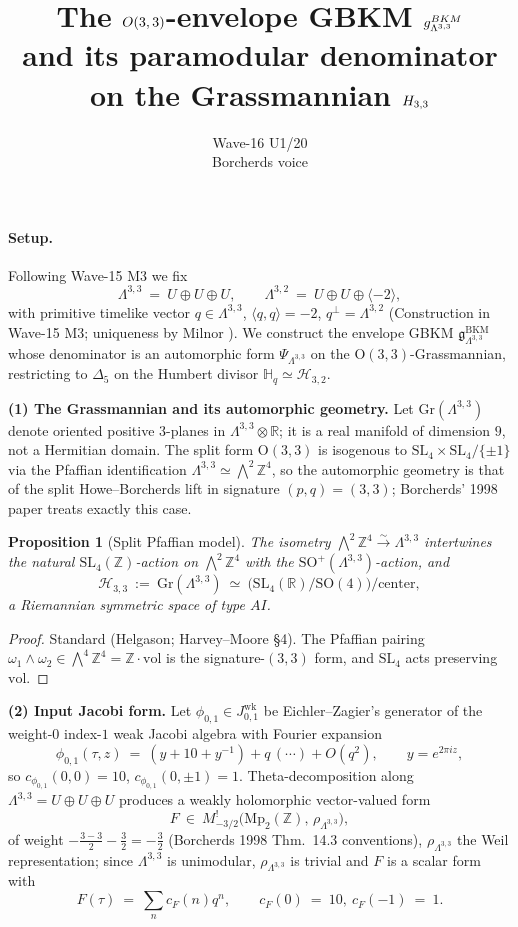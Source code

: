 \documentclass[11pt]{article}
\title{The $\OO(3,3)$-envelope GBKM
$\gBKM^{\mathrm{BKM}}_{\Lat^{3,3}}$\\
and its paramodular denominator on the Grassmannian $\cH_{3,3}$}
\author{Wave-16 U1/20 \\ Borcherds voice}
\date{}
\providecommand{\Lat}{\Lambda}
\providecommand{\Z}{\mathbb{Z}}
\providecommand{\R}{\mathbb{R}}
\providecommand{\HH}{\mathbb{H}}
\providecommand{\cH}{\mathcal{H}}
\providecommand{\gBKM}{\mathfrak{g}}
\providecommand{\OO}{\mathrm{O}}
\providecommand{\SO}{\mathrm{SO}}
\providecommand{\SL}{\mathrm{SL}}
\providecommand{\Mp}{\mathrm{Mp}}
\providecommand{\Delfive}{\Delta_{5}}
\providecommand{\Grass}{\mathrm{Gr}}
\theoremstyle{plain}
\newtheorem{proposition}[theorem]{Proposition}
\theoremstyle{definition}
\begin{document}
\maketitle

\paragraph{Setup.} Following Wave-15 M3 we fix
\[
\Lat^{3,3}\ =\ U\oplus U\oplus U,\qquad
\Lat^{3,2}\ =\ U\oplus U\oplus\langle-2\rangle,
\]
with primitive timelike vector $q\in\Lat^{3,3}$, $\langle q,q\rangle=-2$,
$q^{\perp}=\Lat^{3,2}$ (Construction in Wave-15 M3;
uniqueness by Milnor \cite[Ch.~15]{CS}). We construct the envelope
GBKM $\gBKM^{\mathrm{BKM}}_{\Lat^{3,3}}$ whose denominator is an
automorphic form $\Psi_{\Lat^{3,3}}$ on the $\OO(3,3)$-Grassmannian,
restricting to $\Delfive$ on the Humbert divisor $\HH_q\simeq\cH_{3,2}$.

\medskip

\textbf{(1) The Grassmannian and its automorphic geometry.}
Let $\Grass(\Lat^{3,3})$ denote oriented positive $3$-planes in
$\Lat^{3,3}\otimes\R$; it is a real manifold of dimension $9$, not a
Hermitian domain. The split form $\OO(3,3)$ is isogenous to
$\SL_4\times\SL_4/\{\pm1\}$ via the Pfaffian identification
$\Lat^{3,3}\simeq\bigwedge^2\Z^4$, so the automorphic geometry is
that of the split Howe--Borcherds lift in signature $(p,q)=(3,3)$;
Borcherds' 1998 paper \cite{Bor98} treats exactly this case.

\begin{proposition}[Split Pfaffian model]\label{prop:split-model}
The isometry
$\bigwedge^2\Z^4\xrightarrow{\sim}\Lat^{3,3}$ intertwines the natural
$\SL_4(\Z)$-action on $\bigwedge^2\Z^4$ with the $\SO^+(\Lat^{3,3})$-action, and
\[
\cH_{3,3}\ :=\ \Grass(\Lat^{3,3})\ \simeq\
\bigl(\SL_4(\R)/\mathrm{SO}(4)\bigr)/\mathrm{center},
\]
a Riemannian symmetric space of type $AI$.
\end{proposition}
\begin{proof}
Standard (Helgason; Harvey--Moore \S 4). The Pfaffian pairing
$\omega_1\wedge\omega_2\in\bigwedge^4\Z^4=\Z\cdot\mathrm{vol}$ is the
signature-$(3,3)$ form, and $\SL_4$ acts preserving $\mathrm{vol}$.
\end{proof}

\textbf{(2) Input Jacobi form.} Let $\phi_{0,1}\in J_{0,1}^{\mathrm{wk}}$
be Eichler--Zagier's generator of the weight-$0$ index-$1$ weak Jacobi
algebra with Fourier expansion
\[
\phi_{0,1}(\tau,z)\ =\ (y+10+y^{-1}) + q\,(\cdots) + O(q^2),
\qquad y=e^{2\pi iz},
\]
so $c_{\phi_{0,1}}(0,0)=10$, $c_{\phi_{0,1}}(0,\pm1)=1$. Theta-decomposition
along $\Lat^{3,3}=U\oplus U\oplus U$ produces a weakly holomorphic
vector-valued form
\[
F\ \in\ M^!_{-3/2}\bigl(\Mp_2(\Z),\,\rho_{\Lat^{3,3}}\bigr),
\]
of weight $-\tfrac{3-3}{2}-\tfrac{3}{2}=-\tfrac{3}{2}$ (Borcherds 1998
Thm.~14.3 conventions), $\rho_{\Lat^{3,3}}$ the Weil representation;
since $\Lat^{3,3}$ is unimodular, $\rho_{\Lat^{3,3}}$ is trivial and
$F$ is a scalar form with
\[
F(\tau)\ =\ \sum_n c_F(n)q^n,\qquad c_F(0)\ =\ 10,\
c_F(-1)\ =\ 1.
\]
\end{document}
